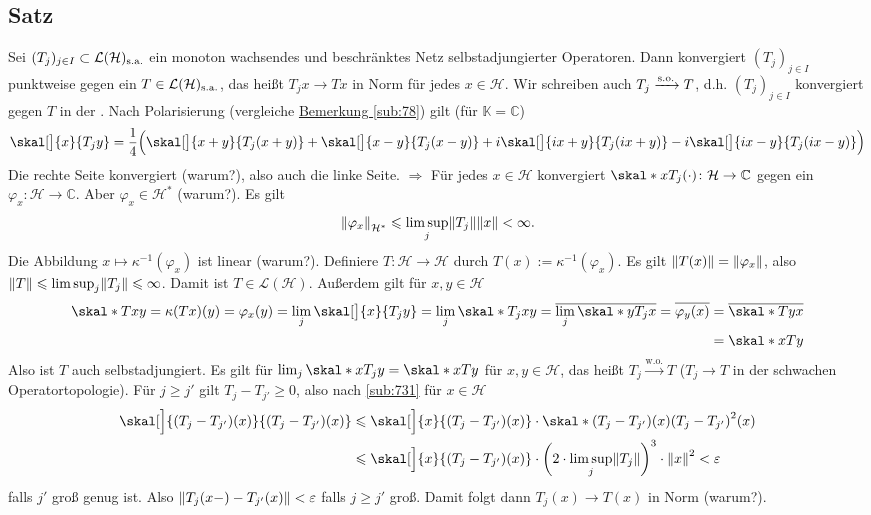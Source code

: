 \subsection{Satz} %
\label{sub:732}
Sei $(T_j)_{j \in I} \subset \mathcal{L}(\mathcal{H})_{\mathrm{s.a.}}$ ein monoton wachsendes und beschränktes Netz selbstadjungierter Operatoren. Dann konvergiert $(T_j)_{j \in I}$
punktweise gegen ein $T \in \mathcal{L}(\mathcal{H})_{\mathrm{s.a.}}$, das heißt $T_j x \to T x$ in Norm für jedes $x \in \mathcal{H}$. Wir schreiben auch $T_j \xrightarrow{\mathrm{s.o.}} T$,
d.h. $(T_j)_{j \in I}$ konvergiert gegen $T$ in der .
Nach Polarisierung (vergleiche \hyperref[sub:78]{Bemerkung \ref*{sub:78}}) gilt (für $\mathds{K}=\mathds{C}$)
\[
	\skal[\big]{x}{T_j y} = \frac{1}{4} \enbrace[\Big]{\skal[\big]{x+y}{T_j(x+y)} + \skal[\big]{x-y}{T_j(x-y)} + i \skal[\big]{i x +y}{T_j(ix +y)} 
	- i \skal[\big]{i x -y}{T_j(ix-y)}}
\]
Die rechte Seite konvergiert (warum?), also auch die linke Seite. $\Rightarrow$ Für jedes $x \in \mathcal{H}$ konvergiert 
$\skal*{x}{T_j(\cdot)} \colon \mathcal{H} \to \mathds{C}$ gegen ein $\varphi_x \colon \mathcal{H} \to \mathds{C}$. Aber $\varphi_x \in \mathcal{H}^*$ (warum?). Es gilt
\begin{equation*}
	\norm[\mathcal{H}^*]{\varphi_x} \le \limsup_j \norm{T_j} \norm{x} < \infty. 
\end{equation*}
Die Abbildung $x \mapsto \kappa ^{-1}(\varphi_x)$ ist linear (warum?). Definiere 
$T \colon \mathcal{H} \to \mathcal{H}$ durch $T(x) := \kappa ^{-1}(\varphi_x)$. Es gilt $\norm{T(x)} = \norm{\varphi_x}$, also $\norm{T}\le\limsup_j \norm{T_j} \le \infty$.
Damit ist $T \in \mathcal{L}(\mathcal{H})$. Außerdem gilt für $x,y \in \mathcal{H}$
\begin{align*}
	\skal*{T x}{y} = \kappa(T x)(y) = \varphi_x(y) = \lim_j \skal[\big]{x}{T_j y} = \lim_j \skal*{T_j x}{y} = \overline{\lim_j \skal*{y}{T_j x}} 
	= \overline{\varphi_y(x)} &= \overline{\skal*{T y}{x}}\\  &= \skal*{x}{T y}  
\end{align*}
Also ist $T$ auch selbstadjungiert. Es gilt für $\lim_j \skal*{x}{T_j y} = \skal*{x}{T y}$ für $x,y \in \mathcal{H}$, das heißt $T_j \xrightarrow{\mathrm{w.o.}} T$
($T_j \to T$ in der schwachen Operatortopologie). Für $j \ge j'$ gilt $T_j - T_{j'} \ge 0$, also nach \ref{sub:731} für $x \in \mathcal{H}$
\begin{align*}
	\skal[\Big]{\enbrace*{T_j - T_{j'}}(x)}{\enbrace*{T_j - T_{j'}}(x)} &\le \skal[\Big]{x}{\enbrace*{T_j - T_{j'}}(x) } \cdot 
	\skal*{\enbrace*{T_j - T_{j'}}(x)}{\enbrace*{T_j - T_{j'}}^2(x) } \\
	&\le \skal[\Big]{x}{\enbrace*{T_j - T_{j'}}(x)} \cdot \enbrace*{2 \cdot \limsup_j \norm{T_j} }^3 \cdot \norm{x}^2 <  \varepsilon
\end{align*}
falls $j'$ groß genug ist. Also $\norm{T_j(x-)- T_{j'}(x)}< \varepsilon$ falls $j \ge j'$ groß. Damit folgt dann $T_j(x) \to T(x)$ in Norm (warum?). \bewende
\newpage

